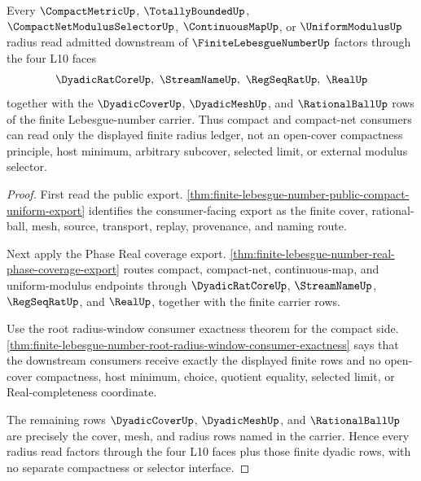 \begin{theorem}
\label{thm:finite-lebesgue-number-four-face-radius-readback}
Every $\CompactMetricUp$, $\TotallyBoundedUp$, $\CompactNetModulusSelectorUp$, $\ContinuousMapUp$, or $\UniformModulusUp$ radius read admitted downstream of $\FiniteLebesgueNumberUp$ factors through the four L10 faces
$$
\DyadicRatCoreUp,\ \StreamNameUp,\ \RegSeqRatUp,\ \RealUp
$$
together with the $\DyadicCoverUp$, $\DyadicMeshUp$, and $\RationalBallUp$ rows of the finite Lebesgue-number carrier. Thus compact and compact-net consumers can read only the displayed finite radius ledger, not an open-cover compactness principle, host minimum, arbitrary subcover, selected limit, or external modulus selector.
\end{theorem}
\begin{proof}
First read the public export. \autoref{thm:finite-lebesgue-number-public-compact-uniform-export} identifies the consumer-facing export as the finite cover, rational-ball, mesh, source, transport, replay, provenance, and naming route.

Next apply the Phase Real coverage export. \autoref{thm:finite-lebesgue-number-real-phase-coverage-export} routes compact, compact-net, continuous-map, and uniform-modulus endpoints through $\DyadicRatCoreUp$, $\StreamNameUp$, $\RegSeqRatUp$, and $\RealUp$, together with the finite carrier rows.

Use the root radius-window consumer exactness theorem for the compact side. \autoref{thm:finite-lebesgue-number-root-radius-window-consumer-exactness} says that the downstream consumers receive exactly the displayed finite rows and no open-cover compactness, host minimum, choice, quotient equality, selected limit, or Real-completeness coordinate.

The remaining rows $\DyadicCoverUp$, $\DyadicMeshUp$, and $\RationalBallUp$ are precisely the cover, mesh, and radius rows named in the carrier. Hence every radius read factors through the four L10 faces plus those finite dyadic rows, with no separate compactness or selector interface.
\end{proof}

